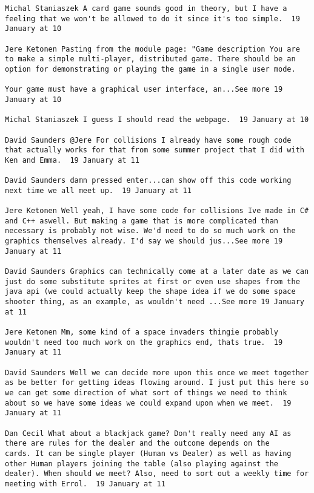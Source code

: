 \begin{verbatim}
Michal Staniaszek A card game sounds good in theory, but I have a
feeling that we won't be allowed to do it since it's too simple.  19
January at 10

Jere Ketonen Pasting from the module page: "Game description You are
to make a simple multi-player, distributed game. There should be an
option for demonstrating or playing the game in a single user mode.

Your game must have a graphical user interface, an...See more 19
January at 10

Michal Staniaszek I guess I should read the webpage.  19 January at 10

David Saunders ‎@Jere For collisions I already have some rough code
that actually works for that from some summer project that I did with
Ken and Emma.  19 January at 11

David Saunders damn pressed enter...can show off this code working
next time we all meet up.  19 January at 11

Jere Ketonen Well yeah, I have some code for collisions Ive made in C#
and C++ aswell. But making a game that is more complicated than
necessary is probably not wise. We'd need to do so much work on the
graphics themselves already. I'd say we should jus...See more 19
January at 11

David Saunders Graphics can technically come at a later date as we can
just do some substitute sprites at first or even use shapes from the
java api (we could actually keep the shape idea if we do some space
shooter thing, as an example, as wouldn't need ...See more 19 January
at 11

Jere Ketonen Mm, some kind of a space invaders thingie probably
wouldn't need too much work on the graphics end, thats true.  19
January at 11

David Saunders Well we can decide more upon this once we meet together
as be better for getting ideas flowing around. I just put this here so
we can get some direction of what sort of things we need to think
about so we have some ideas we could expand upon when we meet.  19
January at 11

Dan Cecil What about a blackjack game? Don't really need any AI as
there are rules for the dealer and the outcome depends on the
cards. It can be single player (Human vs Dealer) as well as having
other Human players joining the table (also playing against the
dealer). When should we meet? Also, need to sort out a weekly time for
meeting with Errol.  19 January at 11


\end{verbatim}
